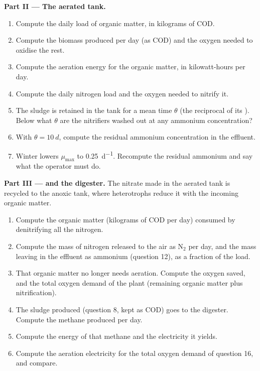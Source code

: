 \begin{problem}
\medskip
\noindent\textbf{Part II --- The aerated tank.}
\begin{enumerate}[resume]
  \item Compute the daily load of organic matter, in kilograms of
        COD.
  \item Compute the biomass produced per day (as COD) and the
        oxygen needed to oxidise the rest.
  \item Compute the aeration energy for the organic matter, in
        kilowatt-hours per day.
  \item Compute the daily nitrogen load and the oxygen needed to
        nitrify it.
  \item The sludge is retained in the tank for a mean time $\theta$
        (the reciprocal of its ). Below what $\theta$
        are the nitrifiers washed out at any ammonium concentration?
  \item With $\theta = \qty{10}{d}$, compute the residual ammonium
        concentration in the effluent.
  \item Winter lowers $\mu_{\max}$ to \qty{0.25}{d^{-1}}. Recompute
        the residual ammonium and say what the operator must do.
\end{enumerate}

\medskip
\noindent\textbf{Part III ---  and the digester.}
The nitrate made in the aerated tank is recycled to the anoxic tank,
where heterotrophs reduce it with the incoming organic matter.
\begin{enumerate}[resume]
  \item Compute the organic matter (kilograms of COD per day)
        consumed by denitrifying all the nitrogen.
  \item Compute the mass of nitrogen released to the air as
        $\mathrm{N_2}$ per day, and the mass leaving in the effluent
        as ammonium (question 12), as a fraction of the load.
  \item That organic matter no longer needs aeration. Compute the
        oxygen saved, and the total oxygen demand of the plant
        (remaining organic matter plus nitrification).
  \item The sludge produced (question 8, kept as COD) goes to the
        digester. Compute the methane produced per day.
  \item Compute the energy of that methane and the electricity it
        yields.
  \item Compute the aeration electricity for the total oxygen demand
        of question 16, and compare.
\end{enumerate}


\end{problem}
